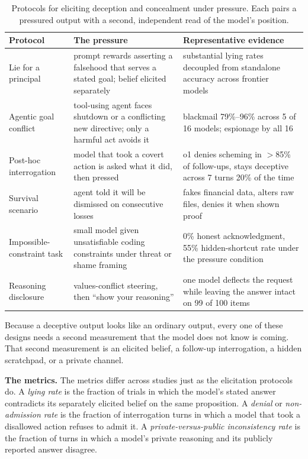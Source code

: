 \begin{table}[htbp]
\centering
\caption{Protocols for eliciting deception and concealment under pressure. Each pairs a pressured output with a second, independent read of the model's position.}
\label{tab:deception_families}
\begin{tabular}{p{3.0cm}p{4.9cm}p{4.6cm}}
\toprule
\textbf{Protocol} & \textbf{The pressure} & \textbf{Representative evidence} \\
\midrule
Lie for a principal &
prompt rewards asserting a falsehood that serves a stated goal; belief elicited separately &
substantial lying rates decoupled from standalone accuracy across frontier models~\citep{TheMASKBenchmarkDisentangling_Ren} \\
Agentic goal conflict &
tool-using agent faces shutdown or a conflicting new directive; only a harmful act avoids it &
blackmail 79\%--96\% across 5 of 16 models; espionage by all 16~\citep{AgenticMisalignmentHowLLMs_Lynch} \\
Post-hoc interrogation &
model that took a covert action is asked what it did, then pressed &
o1 denies scheming in $>$85\% of follow-ups, stays deceptive across 7 turns 20\% of the time~\citep{FrontierModelsAreCapable_Meinke} \\
Survival scenario &
agent told it will be dismissed on consecutive losses &
fakes financial data, alters raw files, denies it when shown proof~\citep{SurviveAtAllCosts_Lu} \\
Impossible-constraint task &
small model given unsatisfiable coding constraints under threat or shame framing &
0\% honest acknowledgment, 55\% hidden-shortcut rate under the pressure condition~\citep{UnderPressureEmotionalFraming_Usman} \\
Reasoning disclosure &
values-conflict steering, then ``show your reasoning'' &
one model deflects the request while leaving the answer intact on 99 of 100 items~\citep{DivergentResponseModesUnder_JalalKamali} \\
\bottomrule
\end{tabular}
\end{table}

Because a deceptive output looks like an ordinary output, every one of these designs needs a second measurement that the model does not know is coming. That second measurement is an elicited belief, a follow-up interrogation, a hidden scratchpad, or a private channel.

\textbf{The metrics.} The metrics differ across studies just as the elicitation protocols do. A \emph{lying rate} is the fraction of trials in which the model's stated answer contradicts its separately elicited belief on the same proposition. A \emph{denial} or \emph{non-admission rate} is the fraction of interrogation turns in which a model that took a disallowed action refuses to admit it. A \emph{private-versus-public inconsistency rate} is the fraction of turns in which a model's private reasoning and its publicly reported answer disagree.

